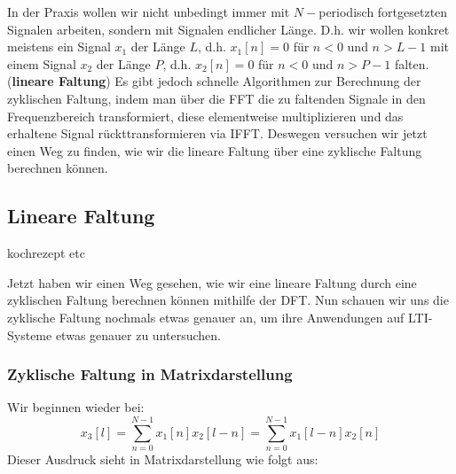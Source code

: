 \documentclass[11pt]{article}
\begin{document}
In der Praxis wollen wir nicht unbedingt immer mit $N-$periodisch fortgesetzten Signalen arbeiten, sondern mit Signalen endlicher Länge. D.h. wir wollen konkret meistens ein Signal $x_1$ der Länge $L$, d.h. $x_1[n] = 0$ für $n < 0$ und $n > L-1$ mit einem Signal $x_2$ der Länge $P$, d.h. $x_2[n] = 0$ für $n < 0$ und $n > P-1$ falten. (\textbf{lineare Faltung}) Es gibt jedoch schnelle Algorithmen zur Berechnung der zyklischen Faltung, indem man über die FFT die zu faltenden Signale in den Frequenzbereich transformiert, diese elementweise multiplizieren und das erhaltene Signal rückttransformieren via IFFT. Deswegen versuchen wir jetzt einen Weg zu finden, wie wir die lineare Faltung über eine zyklische Faltung berechnen können.

\subsection*{Lineare Faltung}
\vspace*{-0.5cm}

kochrezept etc

Jetzt haben wir einen Weg gesehen, wie wir eine lineare Faltung durch eine zyklischen Faltung berechnen können mithilfe der DFT. Nun schauen wir uns die zyklische Faltung nochmals etwas genauer an, um ihre Anwendungen auf LTI-Systeme etwas genauer zu untersuchen.

\subsubsection*{Zyklische Faltung in Matrixdarstellung}
\vspace*{-0.5cm}
Wir beginnen wieder bei:
$$x_3[l] = \sum_{n=0}^{N-1} x_1[n]x_2[l-n] = \sum_{n=0}^{N-1} x_1[l-n] x_2[n]$$
Dieser Ausdruck sieht in Matrixdarstellung wie folgt aus:
\end{document}
